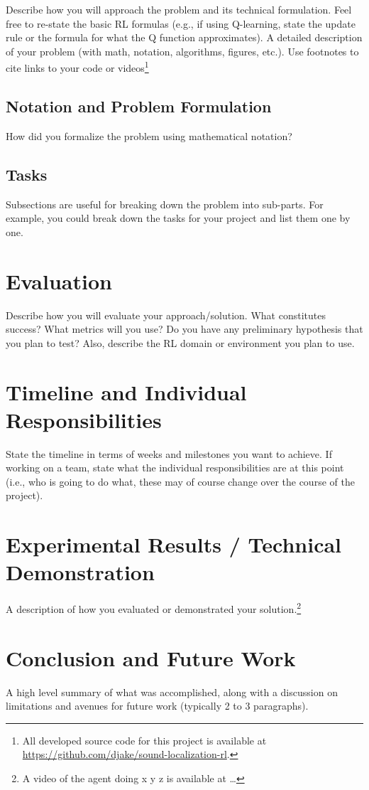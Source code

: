 \ifproposal
Describe how you will approach the problem and its technical formulation.
Feel free to re-state the basic RL formulas (e.g., if using Q-learning, state
the update rule or the formula for what the Q function approximates).
\else
A detailed description of your problem (with math, notation, algorithms,
figures, etc.). Use footnotes to cite links to your code or
videos\footnote{All developed source code for this project is available at
\url{https://github.com/djake/sound-localization-rl}.}

\subsection{Notation and Problem Formulation}

How did you formalize the problem using mathematical notation?
\fi

\subsection{Tasks}

Subsections are useful for breaking down the problem into sub-parts. For
example, you could break down the tasks for your project and list them one by
one.

\ifproposal
\section{Evaluation}

Describe how you will evaluate your approach/solution. What constitutes
success? What metrics will you use? Do you have any preliminary hypothesis
that you plan to test? Also, describe the RL domain or environment you plan to
use.

\section{Timeline and Individual Responsibilities}

State the timeline in terms of weeks and milestones you want to achieve. If
working on a team, state what the individual responsibilities are at this
point (i.e., who is going to do what, these may of course change over the
course of the project).
\else
\section{Experimental Results / Technical Demonstration}

A description of how you evaluated or demonstrated your
solution.\footnote{A video of the agent doing x y z is available at \ldots}

\section{Conclusion and Future Work}

A high level summary of what was accomplished, along with a discussion on
limitations and avenues for future work (typically 2 to 3 paragraphs).
\fi





